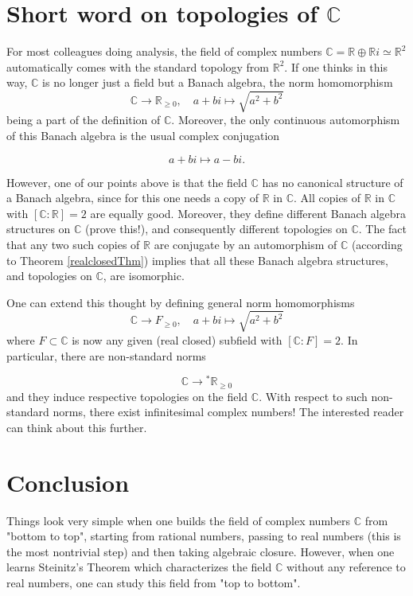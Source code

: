\documentclass[11pt]{article}
\theoremstyle{plain}
\theoremstyle{definition}
\theoremstyle{remark}
\begin{document}
\section{Short word on topologies of $\mathbb{C}$}

For most colleagues doing analysis, the field of complex numbers $\mathbb{C} = \mathbb{R} \oplus \mathbb{R}i \simeq \mathbb{R}^2$ automatically comes with the standard topology from $\mathbb{R}^2$. If one thinks in this way, $\mathbb{C}$ is no longer just a field but a Banach algebra, the norm homomorphism $$\mathbb{C} \to \mathbb{R}_{\geqslant0}, \quad a+bi \mapsto \sqrt{a^2 + b^2}$$ being a part of the definition of $\mathbb{C}$. Moreover, the only continuous automorphism of this Banach algebra is the usual complex conjugation 

$$ a + bi \mapsto a - bi  .$$

However, one of our points above is that the field $\mathbb{C}$ has no canonical structure of a Banach algebra, since for this one needs a copy of $\mathbb{R}$ in $\mathbb{C}$. All copies of $\mathbb{R}$ in $\mathbb{C}$ with $[\mathbb{C}: \mathbb{R}] = 2$ are equally good. Moreover, they define different Banach algebra structures on $\mathbb{C}$ (prove this!), and consequently different topologies on $\mathbb{C}$. 
The fact that any two such copies of $\mathbb{R}$ are conjugate by an automorphism of $\mathbb{C}$ (according to Theorem \ref{realclosedThm}) implies that all these Banach algebra structures, and topologies on $\mathbb{C}$, are isomorphic.
\par
One can extend this thought by defining general norm homomorphisms  $$\mathbb{C} \to F_{\geqslant0}, \quad a + bi \mapsto \sqrt{a^2 + b^2}$$ where $F \subset \mathbb{C}$ is now any given (real closed) subfield with $[\mathbb{C}: F] = 2.$ In particular, there are non-standard norms

$$ 
\mathbb{C} \to {^*\mathbb{R}_{\geqslant0}}
$$
and they induce respective topologies on the field $\mathbb{C}$. With respect to such non-standard norms, there exist infinitesimal complex numbers! The interested reader can think about this further.

\section{Conclusion}

Things look very simple when one builds the field of complex numbers $\mathbb{C}$ from "bottom to top", starting from rational numbers, passing to real numbers (this is the most nontrivial step) and then taking algebraic closure. However, when one learns Steinitz's Theorem which characterizes the field $\mathbb{C}$ without any reference to real numbers, one can study this field from "top to bottom".
\end{document}
